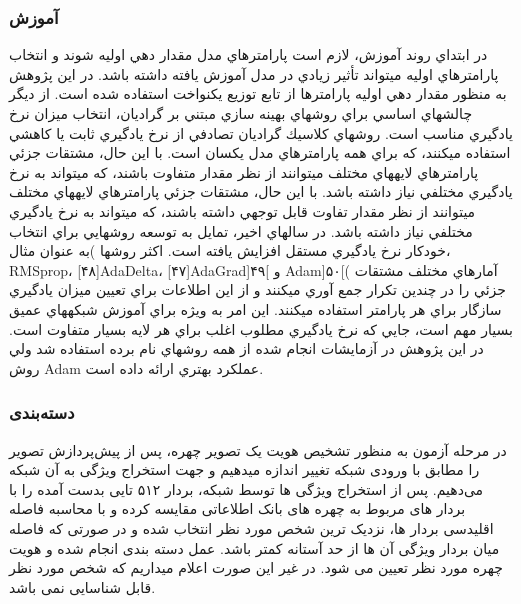 \subsubsection{آموزش‌}
در ابتداي روند آموزش، لازم است پارامترهاي مدل مقدار دهي اوليه شوند و انتخاب پارامترهاي اوليه ميتواند تأثير زيادي در مدل آموزش يافته داشته باشد. در اين پژوهش به منظور مقدار دهي اوليه پارامترها از تابع توزيع يكنواخت استفاده شده است. از ديگر چالشهاي اساسي براي روشهاي بهينه سازي مبتني بر گراديان، انتخاب ميزان نرخ يادگيري مناسب است. روشهاي كلاسيك گراديان تصادفي از نرخ يادگيري ثابت يا كاهشي استفاده ميكنند، كه براي همه پارامترهاي مدل يكسان است. با اين حال، مشتقات جزئي پارامترهاي لايههاي مختلف ميتوانند از نظر مقدار متفاوت باشند، كه ميتواند به نرخ يادگيري مختلفي نياز داشته باشد. با اين حال، مشتقات جزئي پارامترهاي لايههاي مختلف ميتوانند از نظر مقدار تفاوت قابل توجهي داشته باشند، كه ميتواند به نرخ يادگيري مختلفي نياز داشته باشد. در سالهاي اخير، تمايل به توسعه روشهايي براي انتخاب خودكار نرخ يادگيري مستقل افزايش يافته است. اكثر روشها )به عنوان مثال، RMSprop، [۴۸]AdaDelta، [۴۷]AdaGrad]۴۹[ و Adam]۵۰[( آمارهاي مختلف مشتقات جزئي را در چندين تكرار جمع آوري ميكنند و از اين اطلاعات براي تعيين ميزان يادگيري سازگار براي هر پارامتر استفاده ميكنند. اين امر به ويژه براي آموزش شبكههاي عميق بسيار مهم است، جايي كه نرخ يادگيري مطلوب اغلب براي هر لايه بسيار متفاوت است. در اين پژوهش در آزمايشات انجام شده از همه روشهاي نام برده استفاده شد ولي روش Adam عملكرد بهتري ارائه داده است.

\subsubsection{دسته‌بندی}
در مرحله آزمون به منظور تشخیص هویت یک تصویر چهره، پس از پیش‌پردازش تصویر را مطابق با ورودی شبکه تغییر اندازه میدهیم و جهت استخراج ویژگی‌ به آن شبکه می‌دهیم. پس از استخراج ویژگی ها توسط شبکه، بردار ۵۱۲ تایی بدست آمده را با بردار های مربوط به چهره های بانک اطلاعاتی مقایسه کرده و با محاسبه فاصله اقلیدسی بردار ها، نزدیک ترین شخص مورد نظر انتخاب شده و در صورتی که فاصله میان بردار ویژگی آن ها از حد آستانه کمتر باشد. عمل دسته بندی انجام شده و هویت چهره مورد نظر تعیین می شود. در غیر این صورت اعلام میداریم که شخص مورد نظر قابل شناسایی نمی باشد.
%
%
% 


